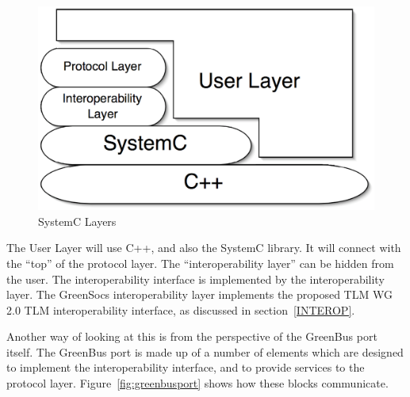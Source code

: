 \documentclass[12pt,oneside]{gsbook}
\begin{document}
\begin{figure}[htbp]
        \centering
        \includegraphics{SystemClayers.eps}
        \caption{SystemC Layers}
        \label{fig:layers}
\end{figure}

The User Layer will use C++, and also the SystemC library. It will
connect with the ``top'' of the protocol layer. The ``interoperability
layer'' can be hidden from the user. The interoperability interface is
implemented by the interoperability layer.  The GreenSocs
interoperability layer implements the proposed TLM WG 2.0 TLM
interoperability interface, as discussed in section~\ref{INTEROP}.




Another way of looking at this is from the perspective of the GreenBus
port itself. The GreenBus port is made up of a number of elements
which are designed to implement the interoperability
interface, and to provide services to the protocol
layer. Figure~\ref{fig:greenbusport} shows how these blocks
communicate.
\end{document}
